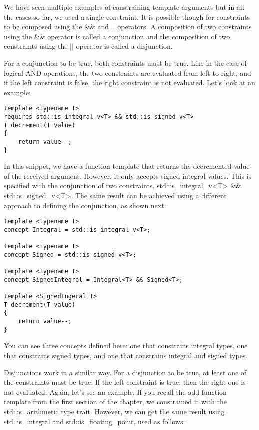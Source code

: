 
We have seen multiple examples of constraining template arguments but in all the cases so far, we used a single constraint. It is possible though for constraints to be composed using the \&\& and || operators. A composition of two constraints using the \&\& operator is called a conjunction and the composition of two constraints using the || operator is called a disjunction.

For a conjunction to be true, both constraints must be true. Like in the case of logical AND operations, the two constraints are evaluated from left to right, and if the left constraint is false, the right constraint is not evaluated. Let’s look at an example:

\begin{lstlisting}[style=styleCXX]
template <typename T>
requires std::is_integral_v<T> && std::is_signed_v<T>
T decrement(T value)
{
	return value--;
}
\end{lstlisting}

In this snippet, we have a function template that returns the decremented value of the received argument. However, it only accepts signed integral values. This is specified with the conjunction of two constraints, std::is\_integral\_v<T> \&\& std::is\_signed\_v<T>. The same result can be achieved using a different approach to defining the conjunction, as shown next:

\begin{lstlisting}[style=styleCXX]
template <typename T>
concept Integral = std::is_integral_v<T>;

template <typename T>
concept Signed = std::is_signed_v<T>;

template <typename T>
concept SignedIntegral = Integral<T> && Signed<T>;

template <SignedIngeral T>
T decrement(T value)
{
	return value--;
}
\end{lstlisting}

You can see three concepts defined here: one that constrains integral types, one that constrains signed types, and one that constrains integral and signed types.

Disjunctions work in a similar way. For a disjunction to be true, at least one of the constraints must be true. If the left constraint is true, then the right one is not evaluated. Again, let’s see an example. If you recall the add function template from the first section of the chapter, we constrained it with the std::is\_arithmetic type trait. However, we can get the same result using std::is\_integral and std::is\_floating\_point, used as follows:

